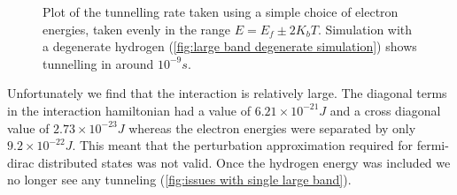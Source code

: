 \begin{figure}[htbp]
\begin{subfigure}{0.45\linewidth}
    \end{subfigure}
    \caption{Plot of the tunnelling rate taken using a
        simple choice of electron energies,
        taken evenly in the range \(E=E_f \pm 2 K_b T\).
        Simulation with a degenerate hydrogen
        (\cref{fig:large band degenerate simulation})
        shows tunnelling in around
        \(10^{-9}s\).
    }\label{fig:tunnelling rate single large band}
\end{figure}
Unfortunately we find that the interaction is
relatively large. The diagonal terms in
the interaction hamiltonian
had a value of \(6.21\times{}10^{-21}J\)
and a cross diagonal value of \(2.73\times{}10^{-23}J\)
whereas the electron energies were separated
by only \(9.2\times{}10^{-22}J\). This meant that
the perturbation approximation required for
fermi-dirac distributed states was not valid.
Once the hydrogen energy was included
we no longer see any tunneling
(\cref{fig:issues with single large band}).
